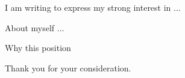 
I am writing to express my strong interest in ...

\begin{point}{About myself}
	...
\end{point}

\begin{point}{Why this position}

\end{point}

Thank you for your consideration.
